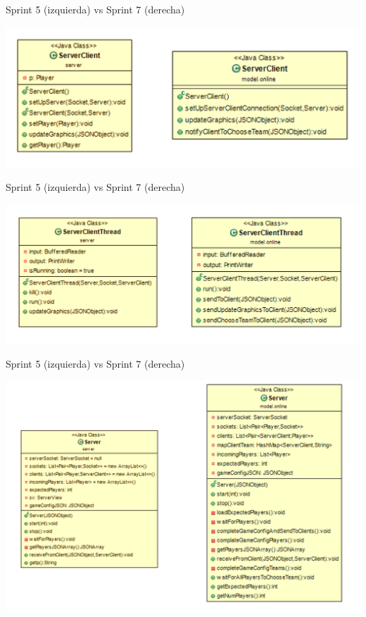 \documentclass[../DocumentoOficial.tex]{subfiles}
\begin{document}
\begin{sprint}[7]
\begin{center}
Sprint 5 (izquierda) vs Sprint 7 (derecha)
\end{center}

\begin{center}
\includegraphics[scale=0.3]{ServerClient-evol.png} 

Sprint 5 (izquierda) vs Sprint 7 (derecha)
\end{center}

\begin{center}
\includegraphics[scale=0.3]{ServerClientThread-evol.png} 

Sprint 5 (izquierda) vs Sprint 7 (derecha)
\end{center}

\begin{center}
\includegraphics[scale=0.3]{server-evol.png} 


\end{center}
\end{sprint}
\end{document}
